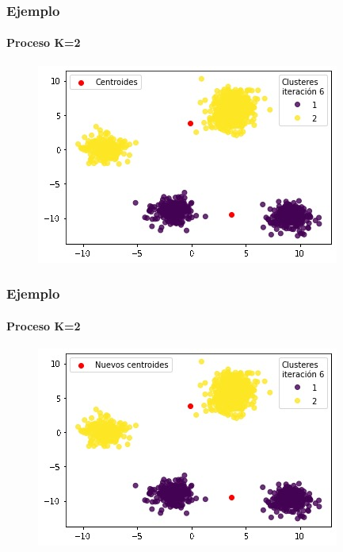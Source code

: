 \documentclass[
  shownotes,
  xcolor={svgnames},
  hyperref={colorlinks,citecolor=DarkBlue,linkcolor=DarkRed,urlcolor=DarkBlue}
  , aspectratio=169]{beamer}
\begin{document}
\begin{frame}
\frametitle{Ejemplo}
\framesubtitle{Proceso K=2}


\begin{figure}[H] \centering

    \centering
    \includegraphics[scale=.7]{figures/k2_9.jpg}
  \\
  \tiny
\end{figure}



\end{frame}
\begin{frame}
\frametitle{Ejemplo}
\framesubtitle{Proceso K=2}


\begin{figure}[H] \centering

    \centering
    \includegraphics[scale=.7]{figures/k2_10.jpg}
  \\
  \tiny
\end{figure}


\end{frame}
\end{document}
